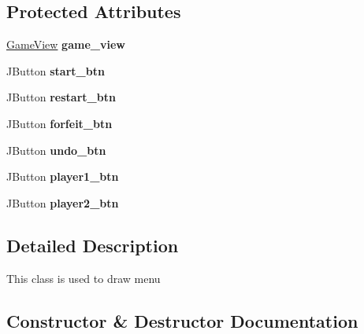 \subsection*{Protected Attributes}
\begin{DoxyCompactItemize}
\item 
\hypertarget{classchess_1_1_menu_view_adefa172949408b1790ff096f9b54a608}{}\hyperlink{classchess_1_1_game_view}{Game\+View} {\bfseries game\+\_\+view}\label{classchess_1_1_menu_view_adefa172949408b1790ff096f9b54a608}

\item 
\hypertarget{classchess_1_1_menu_view_a05538a9fb9546d229bcad6b8a08c9415}{}J\+Button {\bfseries start\+\_\+btn}\label{classchess_1_1_menu_view_a05538a9fb9546d229bcad6b8a08c9415}

\item 
\hypertarget{classchess_1_1_menu_view_a65045bb89a83e5c5e9631f8e158c3a40}{}J\+Button {\bfseries restart\+\_\+btn}\label{classchess_1_1_menu_view_a65045bb89a83e5c5e9631f8e158c3a40}

\item 
\hypertarget{classchess_1_1_menu_view_aa6c03d8d38402aa02ca348bbba9e2980}{}J\+Button {\bfseries forfeit\+\_\+btn}\label{classchess_1_1_menu_view_aa6c03d8d38402aa02ca348bbba9e2980}

\item 
\hypertarget{classchess_1_1_menu_view_a14d65117b41c76711579633c76014de3}{}J\+Button {\bfseries undo\+\_\+btn}\label{classchess_1_1_menu_view_a14d65117b41c76711579633c76014de3}

\item 
\hypertarget{classchess_1_1_menu_view_a9d6092188ac2d5bb418a7f8fdc7b8ac5}{}J\+Button {\bfseries player1\+\_\+btn}\label{classchess_1_1_menu_view_a9d6092188ac2d5bb418a7f8fdc7b8ac5}

\item 
\hypertarget{classchess_1_1_menu_view_a59fe7d3feb2f71eade47ee40d42179f2}{}J\+Button {\bfseries player2\+\_\+btn}\label{classchess_1_1_menu_view_a59fe7d3feb2f71eade47ee40d42179f2}

\end{DoxyCompactItemize}


\subsection{Detailed Description}
This class is used to draw menu 

\subsection{Constructor \& Destructor Documentation}
\hypertarget{classchess_1_1_menu_view_a32fab9a8ed947bdf0552c22c781fe223}{}
